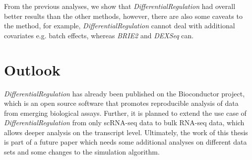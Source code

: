 From the previous analyses, we show that \emph{DifferentialRegulation} had overall better results than the other methods, however, there are also some caveats to the method, for example, \emph{DifferentialRegulation} cannot deal with additional covariates e.g. batch effects, whereas \emph{BRIE2} and \emph{DEXSeq} can. \\

\section{Outlook}
\emph{DifferentialRegulation} has already been published on the Bioconductor project, which is an open source software that promotes reproducible analysis of data from emerging biological assays. Further, it is planned to extend the use case of \emph{DifferentialRegulation} from only scRNA-seq data to bulk RNA-seq data, which allows deeper analysis on the transcript level. Ultimately, the work of this thesis is part of a future paper which needs some additional analyses on different data sets and some changes to the simulation algorithm.
